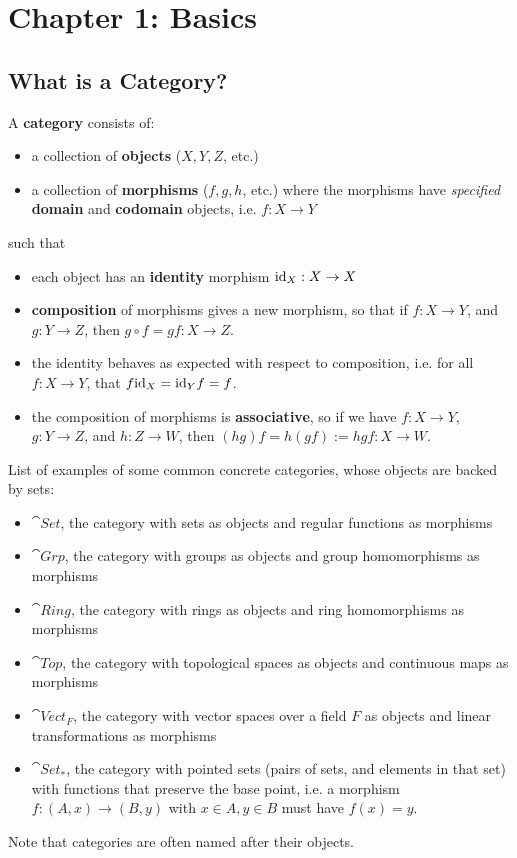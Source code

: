 \section{Chapter 1: Basics}

\subsection{What is a Category?}
\begin{definition}
  A \textbf{category} consists of:
  \begin{itemize}
    \item  a collection of \textbf{objects} ($X, Y, Z$, etc.)
    \item a collection of \textbf{morphisms} ($f, g, h$, etc.) where the morphisms have \textit{specified} \textbf{domain} and \textbf{codomain} objects, i.e. $f : X \to Y$
  \end{itemize}
  such that
  \begin{itemize}
    \item each object has an \textbf{identity} morphism $\mathrm{id}_X : X \to X$
    \item \textbf{composition} of morphisms gives a new morphism, so that if $f : X \to Y$, and $g: Y \to Z$, then $g \circ f = g f : X \to Z$.
    \item the identity behaves as expected with respect to composition, i.e. for all $f : X \to Y$, that $f \mathrm{id}_X = \mathrm{id}_Y f = f$.
    \item the composition of morphisms is \textbf{associative}, so if we have $f : X \to Y$, $g : Y \to Z$, and $h : Z \to W$, then $(hg)f = h(gf) := hgf : X \to W$.
  \end{itemize}
\end{definition}

\begin{example}
  List of examples of some common concrete categories, whose objects are backed by sets:
  \begin{itemize}
    \item $\cat{Set}$, the category with sets as objects and regular functions as morphisms
    \item $\cat{Grp}$, the category with groups as objects and group homomorphisms as morphisms
    \item $\cat{Ring}$, the category with rings as objects and ring homomorphisms as morphisms
    \item $\cat{Top}$, the category with topological spaces as objects and continuous maps as morphisms
    \item $\cat{Vect}_F$, the category with vector spaces over a field $F$ as objects and linear transformations as morphisms
    \item $\cat{Set}_*$, the category with pointed sets (pairs of sets, and elements in that set) with functions that preserve the base point, i.e. a morphism $f : (A, x) \to (B, y)$ with $x \in A, y \in B$ must have $f(x) = y$.
  \end{itemize}
  Note that categories are often named after their objects.
\end{example}

